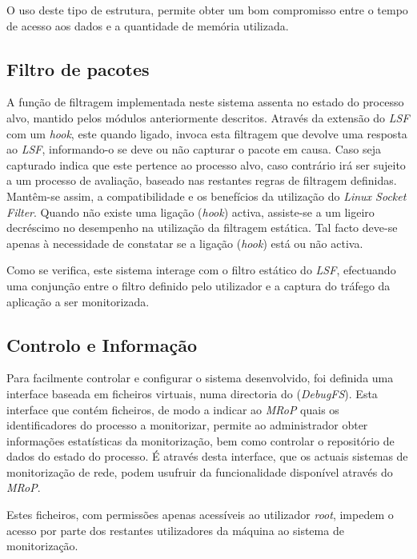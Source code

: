 O uso deste tipo de estrutura, permite obter um bom compromisso entre o tempo de acesso aos dados e a quantidade de memória utilizada.

\subsection{Filtro de pacotes}
\label{sub:packet_filter}

A função de filtragem implementada neste sistema assenta no estado do processo alvo, mantido pelos módulos anteriormente descritos.
Através da extensão do \textit{LSF} com um \textit{hook}, este quando ligado, invoca esta filtragem que devolve uma resposta ao \textit{LSF}, informando-o se deve ou não capturar o pacote em causa.
Caso seja capturado indica que este pertence ao processo alvo, caso contrário irá ser sujeito a um processo de avaliação, baseado nas restantes regras de filtragem definidas.
Mantêm-se assim, a compatibilidade e os benefícios da utilização do \textit{Linux Socket Filter}.
Quando não existe uma ligação (\textit{hook}) activa, assiste-se a um ligeiro decréscimo no desempenho na utilização da filtragem estática.
Tal facto deve-se apenas à necessidade de constatar se a ligação (\textit{hook}) está ou não activa.

Como se verifica, este sistema interage com o filtro estático do \textit{LSF}, efectuando uma conjunção entre o filtro definido pelo utilizador e a captura do tráfego da aplicação a ser monitorizada.

\subsection{Controlo e Informação}
\label{sub:data_information}

Para facilmente controlar e configurar o sistema desenvolvido, foi definida uma interface baseada em ficheiros virtuais, numa directoria do (\textit{DebugFS}).
Esta interface que contém ficheiros, de modo a indicar ao \textit{MRoP} quais os identificadores do processo a monitorizar, permite ao administrador obter informações estatísticas da monitorização, bem como controlar o repositório de dados do estado do processo.
É através desta interface, que os actuais sistemas de monitorização de rede, podem usufruir da funcionalidade disponível através do \textit{MRoP}.

Estes ficheiros, com permissões apenas acessíveis ao utilizador \textit{root}, impedem o acesso por parte dos restantes utilizadores da máquina ao sistema de monitorização.



